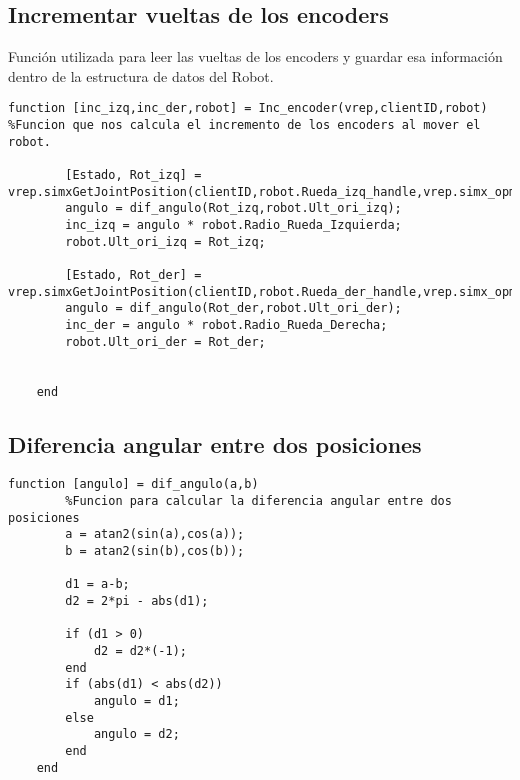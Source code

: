 \subsection{Incrementar vueltas de los encoders}
Función utilizada para leer las vueltas de los encoders y guardar esa información dentro de la estructura de datos del Robot.
\begin{lstlisting}[frame=single]
function [inc_izq,inc_der,robot] = Inc_encoder(vrep,clientID,robot) %Funcion que nos calcula el incremento de los encoders al mover el robot.
        
        [Estado, Rot_izq] = vrep.simxGetJointPosition(clientID,robot.Rueda_izq_handle,vrep.simx_opmode_oneshot_wait);
        angulo = dif_angulo(Rot_izq,robot.Ult_ori_izq);
        inc_izq = angulo * robot.Radio_Rueda_Izquierda;
        robot.Ult_ori_izq = Rot_izq;
        
        [Estado, Rot_der] = vrep.simxGetJointPosition(clientID,robot.Rueda_der_handle,vrep.simx_opmode_oneshot_wait);
        angulo = dif_angulo(Rot_der,robot.Ult_ori_der);
        inc_der = angulo * robot.Radio_Rueda_Derecha;
        robot.Ult_ori_der = Rot_der;
        
        
    end
\end{lstlisting}
\subsection{Diferencia angular entre dos posiciones}
\begin{lstlisting}[frame=single]
 function [angulo] = dif_angulo(a,b)
        %Funcion para calcular la diferencia angular entre dos posiciones
        a = atan2(sin(a),cos(a));
        b = atan2(sin(b),cos(b));

        d1 = a-b;
        d2 = 2*pi - abs(d1);

        if (d1 > 0)
            d2 = d2*(-1);
        end
        if (abs(d1) < abs(d2))
            angulo = d1;
        else 
            angulo = d2;
        end
    end
\end{lstlisting}
